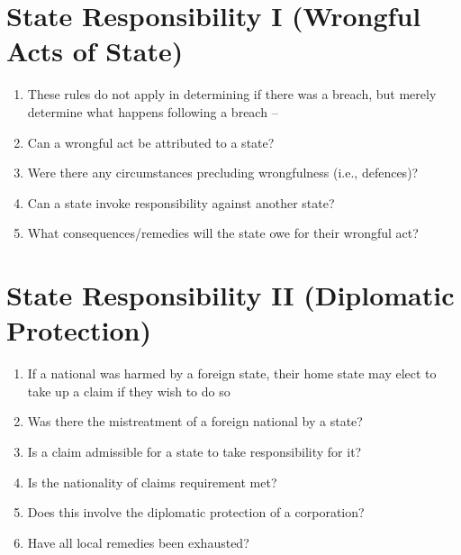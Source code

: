 \section{State Responsibility I (Wrongful Acts of State)}
\begin{enumerate}
    \item These rules do not apply in determining if there was a breach, but merely determine what happens following a breach -- 
    \item Can a wrongful act be attributed to a state?
    \item Were there any circumstances precluding wrongfulness (i.e., defences)?
    \item Can a state invoke responsibility against another state?
    \item What consequences/remedies will the state owe for their wrongful act?
\end{enumerate}

\section{State Responsibility II (Diplomatic Protection)} 
\begin{enumerate}
    \item If a national was harmed by a foreign state, their home state may elect to take up a claim if they wish to do so
    \item Was there the mistreatment of a foreign national by a state?
    \item Is a claim admissible for a state to take responsibility for it?
    \item Is the nationality of claims requirement met?
    \item Does this involve the diplomatic protection of a corporation?
    \item Have all local remedies been exhausted?
\end{enumerate}

